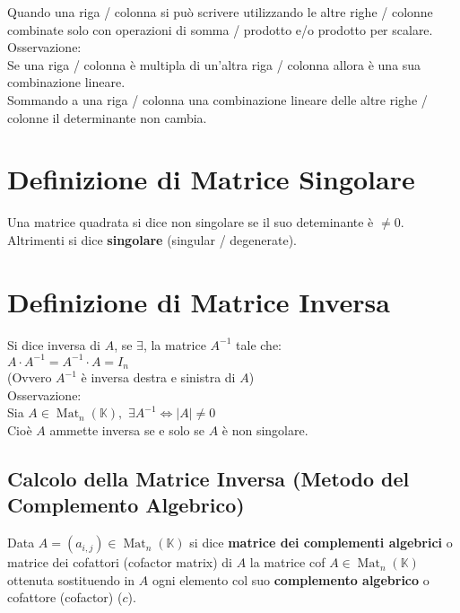 \documentclass[a4paper, twoside, italian, 11pt]{book}
\newcommand{\detm}[1] {\left | #1 \right |}
\DeclareMathOperator{\Mat}{Mat}
\newcommand{\K}{\mathbb K}
\begin{document}
Quando una riga / colonna si può scrivere utilizzando le altre righe / colonne combinate solo con operazioni di somma / prodotto e/o prodotto per scalare. \\

\noindent
Osservazione: \\
Se una riga / colonna è multipla di un'altra riga / colonna allora è una sua combinazione lineare. \\

\noindent
Sommando a una riga / colonna una combinazione lineare delle altre righe / colonne il determinante non cambia. \\



\section{Definizione di Matrice Singolare}
Una matrice quadrata si dice non singolare se il suo deteminante è $\neq 0$. Altrimenti si dice \textbf{singolare} (singular / degenerate).



\section{Definizione di Matrice Inversa}

Si dice inversa di $A$, se $\exists$, la matrice $A^{-1}$ tale che: \\

\noindent
$A \cdot A^{-1} = A^{-1} \cdot A = I_n$ \\

\noindent
(Ovvero $A^{-1}$ è inversa destra e sinistra di $A$) \\

\noindent
Osservazione: \\
Sia $A \in \Mat_n(\K),$ $\exists A^{-1} \iff \detm A \neq 0$ \\

\noindent
Cioè $A$ ammette inversa se e solo se $A$ è non singolare.


\subsection{Calcolo della Matrice Inversa (Metodo del Complemento Algebrico)}

Data $A = (a_{i,j}) \in \Mat_n(\K)$ si dice \textbf{matrice dei complementi algebrici} o matrice dei cofattori (cofactor matrix) di $A$ la matrice cof $A \in \Mat_n(\K)$ ottenuta sostituendo in $A$ ogni elemento col suo \textbf{complemento algebrico} o cofattore (cofactor) ($c$). \\
\end{document}
